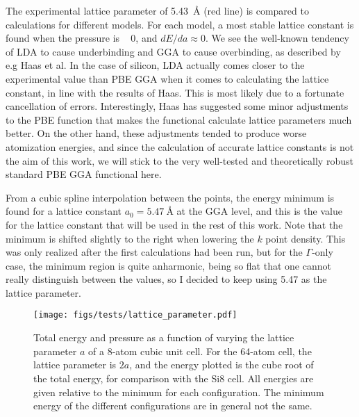 \documentclass[11pt,bibliography=totoc,index=totoc]{scrbook}   %
\begin{document}
The experimental lattice parameter of \SI{5.43}{\angstrom} (red line) is compared to calculations for different models.
For each model, a most stable lattice constant is found when the pressure is ~ 0, and $dE/da \approx 0$.
We see the well-known tendency of LDA to cause underbinding and GGA to cause overbinding, as described by e.g Haas et al.\cite{Haas:2010}
In the case of silicon, LDA actually comes closer to the experimental value than PBE GGA when it comes to calculating the lattice constant,
in line with the results of Haas. This is most likely due to a fortunate cancellation of errors. 
Interestingly, Haas has suggested some minor adjustments to the PBE function that makes the functional calculate lattice parameters much better. 
On the other hand, these adjustments tended to produce worse atomization energies, and 
since the calculation of accurate lattice constants is not the aim of this work, we will stick to the very well-tested and 
theoretically robust standard PBE GGA functional here. 

From a cubic spline interpolation between the points, the energy minimum is found for a lattice constant $a_0=\SI{5.47}{\angstrom}$ at the GGA level, and this is the value for the lattice constant that will be used in the rest of this work. 
Note that the minimum is shifted slightly to the right when lowering the $k$ point density. 
This was only realized after the first calculations had been run, but for the $\Gamma$-only case, 
the minimum region is quite anharmonic, being so flat that one cannot really distinguish between the values,
so I decided to keep using 5.47 as the lattice parameter.

\begin{figure}[htbp]
  \begin{center}
    \texttt{[image: figs/tests/lattice\_parameter.pdf]}
  \end{center}
  \caption{
     Total energy and pressure as a function of varying the lattice parameter $a$ of a 8-atom cubic unit cell.
     For the 64-atom cell, the lattice parameter is $2a$, and the energy plotted is the cube root of the total energy,
     for comparison with the Si8 cell. All energies are given relative to the minimum for each configuration.
     The minimum energy of the different configurations are in general not the same.
  }
  \label{fig:si_bulk_conv_vol}
\end{figure}
\end{document}
